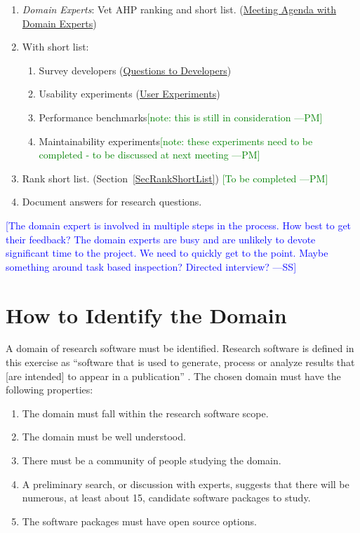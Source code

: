 \documentclass[letterpaper,cleveref]{lipics-v2019}
\newcommand{\authornote}[3]{\textcolor{#1}{[#3 ---#2]}}
\newcommand{\authornote}[3]{}
\newcommand{\wss}[1]{\authornote{blue}{SS}{#1}} %
\newcommand{\pmi}[1]{\authornote{green}{PM}{#1}} %
\theoremstyle{definition}
\begin{document}
\begin{enumerate}
\item \emph{Domain Experts}: Vet AHP ranking and short list. (\href{run:Meeting Agenda with Domain Experts.pdf}{Meeting Agenda with Domain Experts})
\item With short list:
\begin{enumerate}
\item Survey developers (\href{run:Questions to Developers.pdf}{Questions to Developers})
\item Usability experiments (\href{run:User Experiments.pdf}{User Experiments})
\item Performance benchmarks\pmi{note: this is still in consideration}
\item Maintainability experiments\pmi{note: these experiments need to be completed - to be discussed at next meeting}
\end{enumerate}
\item Rank short list. (Section~\ref{SecRankShortList}) \pmi{To be completed}
\item Document answers for research questions.
\end{enumerate}

\wss{The domain expert is involved in multiple steps in the process.  How best
  to get their feedback?  The domain experts are busy and are unlikely to devote
  significant time to the project.  We need to quickly get to the point.  Maybe
  something around task based inspection?  Directed interview?}


\section{How to Identify the Domain} \label{SecIdentifyDomain}
A domain of research software must be identified. Research software is defined in this exercise as ``software that is used to generate, process or analyze results that [are intended] to appear in a publication'' \citep{hettrick2014uk}. The chosen domain must have the following properties:

\begin{enumerate}	
	\item The domain must fall within the research software scope.
	\item The domain must be well understood.
	\item There must be a community of people studying the domain.
	\item A preliminary search, or discussion with experts, suggests that there will be numerous, at least about 15, candidate software packages to study.
	\item The software packages must have open source options. 
\end{enumerate}
\end{document}
